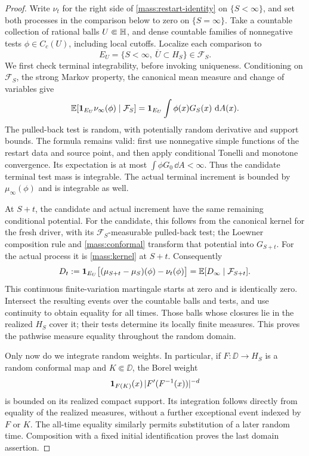 \begin{proof}
Write $\nu_t$ for the right side of \eqref{mass:restart-identity} on
$\{S<\infty\}$, and set both processes in the comparison below to zero
on $\{S=\infty\}$.  Take a countable collection of rational balls
$U\Subset\mathbb H$, and dense
countable families of nonnegative tests $\phi\in C_c(U)$, including local
cutoffs.  Localize each comparison to
\[
 E_U=\{S<\infty,\ \overline U\subset H_S\}\in\mathcal F_S.
\]
We first check terminal integrability, before invoking uniqueness.
Conditioning on $\mathcal F_S$, the strong Markov property, the canonical
mean measure and change of variables give
\begin{equation}
 \mathbb E[\mathbf 1_{E_U}\nu_\infty(\phi)\mid\mathcal F_S]
       =\mathbf 1_{E_U}\int\phi(x)G_S(x)\,\mathop{}\!\mathrm{d} A(x).
 \label{mass:restart-integrability}
\end{equation}
The pulled-back test is random, with potentially random derivative and
support bounds.  The formula remains valid: first use nonnegative simple
functions of the restart data and source point, and then apply conditional
Tonelli and monotone convergence.  Its expectation is at most
$\int\phi G_0\,\dd A<\infty$.  Thus the candidate terminal test mass is
integrable.  The actual terminal increment is bounded by
$\mu_\infty(\phi)$ and is integrable as well.

At $S+t$, the candidate and actual increment have the same remaining
conditional potential.  For the candidate, this follows from the
canonical kernel for the fresh driver, with its $\mathcal F_S$-measurable
pulled-back test; the Loewner composition rule and
\eqref{mass:conformal} transform that potential into $G_{S+t}$.
For the actual process it is \eqref{mass:kernel} at $S+t$.
Consequently
\[
 D_t:=\mathbf 1_{E_U}\bigl[(\mu_{S+t}-\mu_S)(\phi)-\nu_t(\phi)\bigr]
       =\mathbb E[D_\infty\mid\mathcal F_{S+t}].
\]
This continuous finite-variation martingale starts at zero and is
identically zero.  Intersect the resulting events over the countable
balls and tests, and use continuity to obtain equality for all times.
Those balls whose closures lie in the realized $H_S$ cover it; their
tests determine its locally finite measures.  This proves the pathwise
measure equality throughout the random domain.

Only now do we integrate random weights.  In particular, if
$F:\DD\to H_S$ is a random conformal map and $K\Subset\DD$, the Borel
weight
\[
 \mathbf 1_{F(K)}(x)\,|F'(F^{-1}(x))|^{-d}
\]
is bounded on its realized compact support.  Its integration follows
directly from equality of the realized measures, without a further
exceptional event indexed by $F$ or $K$.  The all-time equality similarly
permits substitution of a later random time.  Composition with a fixed
initial identification proves the last domain assertion.
\end{proof}

